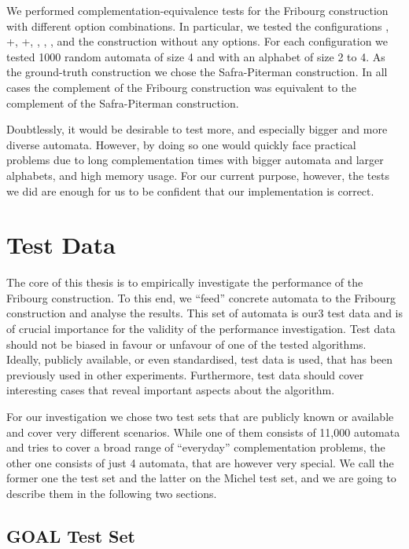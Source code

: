 We performed complementation-equivalence tests for the Fribourg construction with different option combinations. In particular, we tested the configurations , +, +, , , , and the construction without any options. For each configuration we tested 1000 random automata of size 4 and with an alphabet of size 2 to 4. As the ground-truth construction we chose the Safra-Piterman construction. In all cases the complement of the Fribourg construction was equivalent to the complement of the Safra-Piterman construction.

Doubtlessly, it would be desirable to test more, and especially bigger and more diverse automata. However, by doing so one would quickly face practical problems due to long complementation times with bigger automata and larger alphabets, and high memory usage. For our current purpose, however, the tests we did are enough for us to be confident that our implementation is correct.

\section{Test Data}
The core of this thesis is to empirically investigate the performance of the Fribourg construction. To this end, we ``feed'' concrete automata to the Fribourg construction and analyse the results. This set of automata is our3 test data and is of crucial importance for the validity of the performance investigation. Test data should not be biased in favour or unfavour of one of the tested algorithms. Ideally, publicly available, or even standardised, test data is used, that has been previously used in other experiments. Furthermore, test data should cover interesting cases that reveal important aspects about the algorithm.

For our investigation we chose two test sets that are publicly known or available and cover very different scenarios. While one of them consists of 11,000 automata and tries to cover a broad range of ``everyday'' complementation problems, the other one consists of just 4 automata, that are however very special. We call the former one the \goal{} test set and the latter on the Michel test set, and we are going to describe them in the following two sections.


\subsection{GOAL Test Set}
\label{4_goal_testset}

